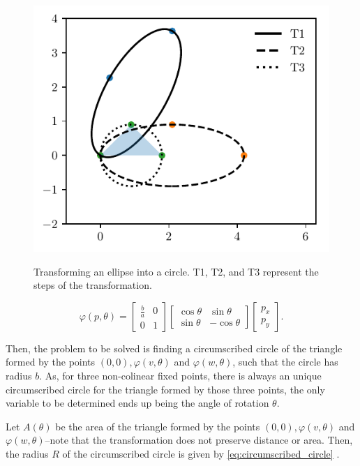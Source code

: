 \begin{figure}[H]
	\centering
	\caption{Transforming an ellipse into a circle. T1, T2, and T3 represent the steps of the transformation.}
	\includegraphics{tex/figures/scripts/circumscribed-circle}
	\fautor
	\label{fig:circumscribed-circle}
\end{figure}
\begin{equation}\label{eq:trpnts}
\varphi(p, \theta)=\left[\begin{array}{cc}
\frac{b}{a}&0\\
0&1
\end{array}\right]
\left[\begin{array}{cc}
\cos{\theta}&\sin{\theta}\\
\sin{\theta}&-\cos{\theta}
\end{array}\right]\left[\begin{array}{c}
p_x\\
p_y
\end{array}\right].
\end{equation}

Then, the problem to be solved is finding a circumscribed circle of the triangle formed by the points $(0, 0), \varphi(v, \theta)$ and $\varphi(w, \theta)$, such that the circle has radius $b$. As, for three non-colinear fixed points, there is always an unique circumscribed circle for the triangle formed by those three points, the only variable to be determined ends up being the angle of rotation $\theta$.

Let $A(\theta)$ be the area of the triangle formed by the points $(0, 0), \varphi(v, \theta)$ and $\varphi(w, \theta)$--note that the transformation does not preserve distance or area. Then, the radius $R$ of the circumscribed circle is given by \autoref{eq:circumscribed_circle} \cite[p.~189]{johnson1960}.

